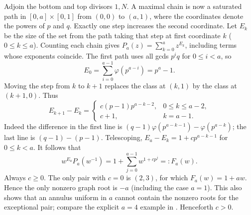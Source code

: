 \documentclass[11pt,a4paper]{article}
\numberwithin{equation}{section}
\theoremstyle{definition}
\theoremstyle{remark}
\begin{document}
Adjoin the bottom and top divisors $1,N$. A maximal chain is now a saturated path in $[0,a]\times[0,1]$ from $(0,0)$ to $(a,1)$, where the coordinates denote the powers of $p$ and $q$. Exactly one step increases the second coordinate. Let $E_k$ be the size of the set from the path taking that step at first coordinate $k$ ($0\le k\le a$). Counting each chain gives $P_a(z)=\sum_{k=0}^a z^{E_k}$, including terms whose exponents coincide. The first path uses all gcds $p^i q$ for $0\le i<a$, so
\[
 E_0=\sum_{i=0}^{a-1}\varphi(p^{a-i})=p^a-1.
\]
Moving the step from $k$ to $k+1$ replaces the class at $(k,1)$ by the class at $(k+1,0)$. Thus
\[
 E_{k+1}-E_k=
 \begin{cases}
 c(p-1)p^{a-k-2}, &0\le k\le a-2,\\
 c+1, & k=a-1 .
 \end{cases}
\]
Indeed the difference in the first line is $(q-1)\varphi(p^{a-k-1})-\varphi(p^{a-k})$; the last line is $(q-1)-(p-1)$. Telescoping, $E_a-E_k=1+c p^{a-k-1}$ for $0\le k<a$. It follows that
\[
 w^{E_a}P_a(w^{-1})=1+\sum_{j=0}^{a-1}w^{1+c p^j}=:F_a(w).
\]
Always $c\ge0$. The only pair with $c=0$ is $(2,3)$, for which $F_a(w)=1+aw$. Hence the only nonzero graph root is $-a$ (including the case $a=1$). This also shows that an annulus uniform in $a$ cannot contain the nonzero roots for the exceptional pair; compare the explicit $a=4$ example in \cite[Ex.~2.2]{r42reiwa:DML}. Henceforth $c>0$.
\end{document}
